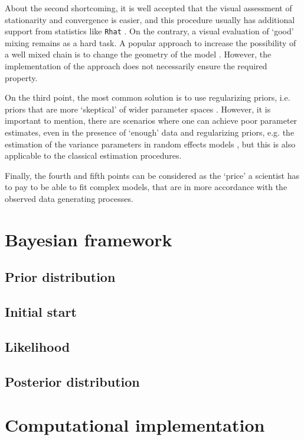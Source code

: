 About the second shortcoming, it is well accepted that the visual assessment of stationarity and convergence is easier, and this procedure usually has additional support from statistics like \texttt{Rhat} \cite{Gelman_et_al_2014}. On the contrary, a visual evaluation of `good' mixing remains as a hard task. A popular approach to increase the possibility of a well mixed chain is to change the geometry of the model \cite{McElreath_2020}. However, the implementation of the approach does not necessarily ensure the required property.

On the third point, the most common solution is to use regularizing priors, i.e. priors that are more `skeptical' of wider parameter spaces \cite{McElreath_2020}. However, it is important to mention, there are scenarios where one can achieve poor parameter estimates, even in the presence of `enough' data and regularizing priors, e.g. the estimation of the variance parameters in random effects models \cite{Skrondal_et_al_2004a}, but this is also applicable to the classical estimation procedures.

Finally, the fourth and fifth points can be considered as the `price' a scientist has to pay to be able to fit complex models, that are in more accordance with the observed data generating processes.

\section{Bayesian framework}

\subsection{Prior distribution}

\subsection{Initial start}

\subsection{Likelihood}

\subsection{Posterior distribution}


\section{Computational implementation} \label{sect:comp_imp}

